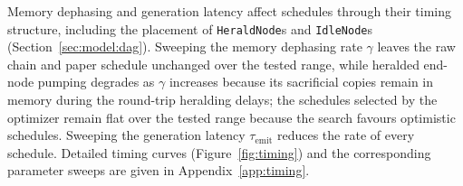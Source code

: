 
Memory dephasing and generation latency affect schedules through their timing structure, including the placement of \texttt{HeraldNode}s and \texttt{IdleNode}s (Section~\ref{sec:model:dag}). Sweeping the memory dephasing rate $\gamma$ leaves the raw chain and paper schedule unchanged over the tested range, while heralded end-node pumping degrades as $\gamma$ increases because its sacrificial copies remain in memory during the round-trip heralding delays; the schedules selected by the optimizer remain flat over the tested range because the search favours optimistic schedules. Sweeping the generation latency $\tau_{\mathrm{emit}}$ reduces the rate of every schedule. Detailed timing curves (Figure~\ref{fig:timing}) and the corresponding parameter sweeps are given in Appendix~\ref{app:timing}.